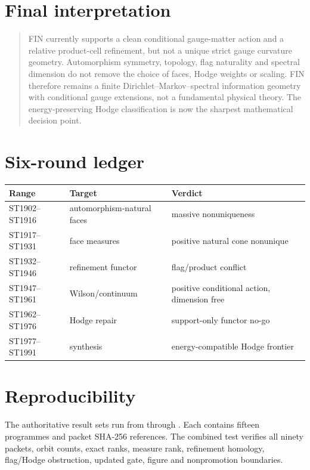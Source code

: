 \documentclass[11pt,a4paper]{article}
\begin{document}
\section{Final interpretation}

\begin{quote}
FIN currently supports a clean conditional gauge-matter action and a relative
product-cell refinement, but not a unique strict gauge curvature geometry.
Automorphism symmetry, topology, flag naturality and spectral dimension do not
remove the choice of faces, Hodge weights or scaling.  FIN therefore remains a
finite Dirichlet--Markov--spectral information geometry with conditional gauge
extensions, not a fundamental physical theory.  The energy-preserving Hodge
classification is now the sharpest mathematical decision point.
\end{quote}

\appendix
\section{Six-round ledger}
\begin{longtable}{@{}p{}p{}p{}@{}}
\toprule
Range & Target & Verdict \\
\midrule\endhead
ST1902--ST1916 & automorphism-natural faces & massive nonuniqueness \\
ST1917--ST1931 & face measures & positive natural cone nonunique \\
ST1932--ST1946 & refinement functor & flag/product conflict \\
ST1947--ST1961 & Wilson/continuum & positive conditional action, dimension free \\
ST1962--ST1976 & Hodge repair & support-only functor no-go \\
ST1977--ST1991 & synthesis & energy-compatible Hodge frontier \\
\bottomrule
\end{longtable}

\section{Reproducibility}
The authoritative result sets run from
 through
.  Each contains fifteen programmes and
packet SHA-256 references.  The combined test
 verifies all ninety packets, orbit counts,
exact ranks, measure rank, refinement homology, flag/Hodge obstruction, updated
gate, figure and nonpromotion boundaries.
\end{document}
